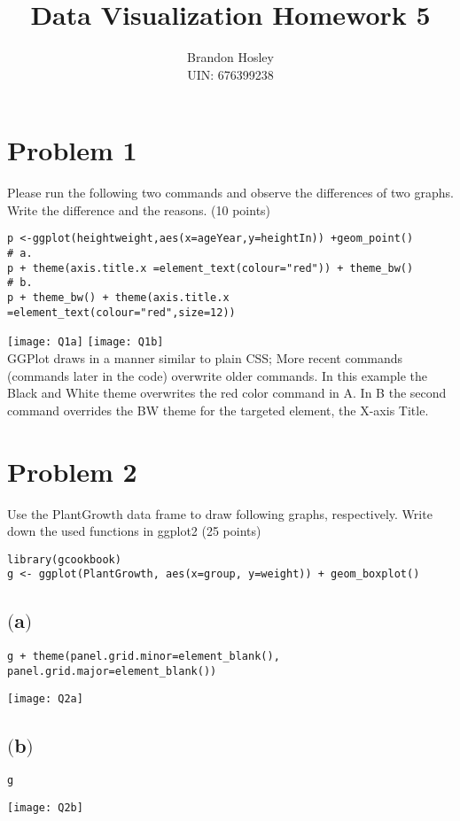 \documentclass[a4paper,man,natbib]{apa6}
\title{Data Visualization Homework 5}
\author{Brandon Hosley \\ UIN: 676399238}
\date{}
\affiliation{Yanhui Guo, Ph.D}
\begin{document}
\maketitle
\singlespacing
\raggedbottom
	
\section{Problem 1}
Please run the following two commands and observe the differences of two graphs. Write the difference and the reasons. (10 points)
\begin{verbatim}
p <-ggplot(heightweight,aes(x=ageYear,y=heightIn)) +geom_point()
# a.
p + theme(axis.title.x =element_text(colour="red")) + theme_bw()
# b.
p + theme_bw() + theme(axis.title.x =element_text(colour="red",size=12))
\end{verbatim}
\texttt{[image: Q1a]}
\texttt{[image: Q1b]} \\
GGPlot draws in a manner similar to plain CSS; More recent commands (commands later in the code) overwrite older commands. In this example the Black and White theme overwrites the red color command in A. In B the second command overrides the BW theme for the targeted element, the X-axis Title.

\pagebreak

\section{Problem 2}
Use the PlantGrowth data frame to draw following graphs, respectively.  Write down the used functions in ggplot2 (25 points) 

\begin{verbatim}
library(gcookbook)
g <- ggplot(PlantGrowth, aes(x=group, y=weight)) + geom_boxplot()
\end{verbatim}

\subsection{$($a$)$}
\begin{verbatim}
g + theme(panel.grid.minor=element_blank(), panel.grid.major=element_blank())
\end{verbatim}
\texttt{[image: Q2a]}

\subsection{$($b$)$}
\begin{verbatim}
g
\end{verbatim}
\texttt{[image: Q2b]}
\end{document}
